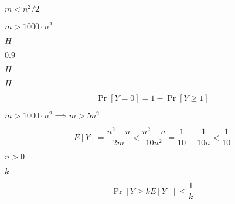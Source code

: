 \documentclass[10pt]{book}
\begin{document}
\begin{mdSnippets}
\begin{mdInlineSnippet}
$m < n^2/2$\end{mdInlineSnippet}%
\begin{mdInlineSnippet}%
$m > 1000\cdot n^2$\end{mdInlineSnippet}%
\begin{mdInlineSnippet}[c1d9f50f86825a1a2302ec2449c17196]%
$H$\end{mdInlineSnippet}%
\begin{mdInlineSnippet}%
$0.9$\end{mdInlineSnippet}%
\begin{mdInlineSnippet}[c1d9f50f86825a1a2302ec2449c17196]%
$H$\end{mdInlineSnippet}%
\begin{mdInlineSnippet}[c1d9f50f86825a1a2302ec2449c17196]%
$H$\end{mdInlineSnippet}%
\begin{mdDisplaySnippet}[b73bc8ecef9cb1208c350c2596679cd9]%
\[%
\Pr[Y = 0] = 1 - \Pr[Y \geq 1]
\]%
\end{mdDisplaySnippet}%
\begin{mdInlineSnippet}[05497f3e6c7e0776a38426f0b74187f5]%
$m > 1000\cdot n^2 \implies m > 5 n^2$\end{mdInlineSnippet}%
\begin{mdDisplaySnippet}[131cb1d91e2c3a2621fd6c51aae5e43d]%
\[%
E[Y] = \frac{n^2-n}{2m} < \frac{n^2 - n}{10 n^2} = \frac{1}{10} - \frac{1}{10n} < \frac{1}{10}
\]%
\end{mdDisplaySnippet}%
\begin{mdInlineSnippet}[de41f86e42a74b61a37b3a76b7f5edfb]%
$n > 0$\end{mdInlineSnippet}%
\begin{mdInlineSnippet}[8ce4b16b22b58894aa86c421e8759df3]%
$k$\end{mdInlineSnippet}%
\begin{mdDisplaySnippet}%
\[%
\Pr[Y \geq kE[Y]] \leq \frac{1}{k}
\]%
\end{mdDisplaySnippet}%
\begin{mdInlineSnippet}[df53696ef959582fd8f0074c5f3d8002]%

\end{mdInlineSnippet}
\end{mdSnippets}
\end{document}

